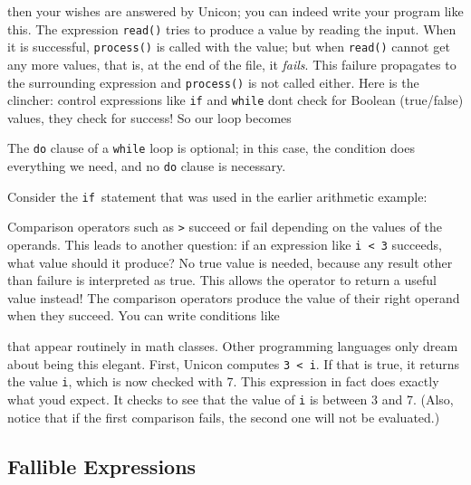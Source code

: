 
\noindent
then your wishes are answered by Unicon; you can indeed write your
program like this. The expression \texttt{read()} tries to produce a
value by reading the input. When it is successful, \texttt{process()}
is called with the value; but when \texttt{read()} cannot get any more
values, that is, at the end of the file, it \textit{fails}. This
failure propagates to the surrounding expression and \texttt{process()}
is not called either. Here is the clincher: control expressions like
\texttt{if} and \texttt{while} don{\textquotesingle}t check for Boolean
(true/false) values, they check for success! So our loop
becomes


The \texttt{do} clause of a \texttt{while} loop is
optional; in this case, the condition does everything
we need, and no \texttt{do} clause is necessary.

Consider the \texttt{if}\texttt{ }statement that was
used in the earlier arithmetic example:


Comparison operators such as \texttt{{\textgreater}} succeed or fail
depending on the values of the operands. This leads to another
question: if an expression like \texttt{i {\textless} 3} succeeds, what
value should it produce? No {\textquotedbl}true{\textquotedbl} value is
needed, because any result other than failure is interpreted as
{\textquotedbl}true.{\textquotedbl} This allows the operator to return
a useful value instead! The comparison
operators produce the value of their right operand when they succeed.
You can write conditions like


\noindent
that appear routinely in math classes. Other programming languages only
dream about being this elegant. First, Unicon computes \texttt{3
{\textless} i}. If that is true, it returns the value \texttt{i}, which
is now checked with 7. This expression in fact does exactly what
you{\textquotesingle}d expect. It checks to see that the value of
\texttt{i} is between 3 and 7. (Also, notice that if the first
comparison fails, the second one will not be evaluated.)

\subsection{Fallible Expressions}

